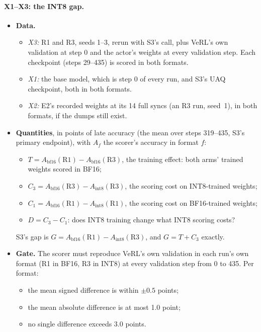 \documentclass[11pt]{article}
\begin{document}
\paragraph{X1--X3: the INT8 gap.}
\begin{itemize}
\item \textbf{Data.}
  \begin{itemize}
  \item \emph{X3:} R1 and R3, seeds 1--3, rerun with S3's call, plus VeRL's own validation at step 0 and the actor's weights at every validation step. Each checkpoint (steps 29--435) is scored in both formats.
  \item \emph{X1:} the base model, which is step 0 of every run, and S3's UAQ checkpoint, both in both formats.
  \item \emph{X2:} E2's recorded weights at its 14 full syncs (an R3 run, seed~1), in both formats, if the dumps still exist.
  \end{itemize}
\item \textbf{Quantities}, in points of late accuracy (the mean over steps 319--435, S3's primary endpoint), with $A_f$ the scorer's accuracy in format $f$:
  \begin{itemize}
  \item $T=A_{\mathrm{bf16}}(\mathrm{R1})-A_{\mathrm{bf16}}(\mathrm{R3})$, the training effect: both arms' trained weights scored in BF16;
  \item $C_3=A_{\mathrm{bf16}}(\mathrm{R3})-A_{\mathrm{int8}}(\mathrm{R3})$, the scoring cost on INT8-trained weights;
  \item $C_1=A_{\mathrm{bf16}}(\mathrm{R1})-A_{\mathrm{int8}}(\mathrm{R1})$, the scoring cost on BF16-trained weights;
  \item $D=C_3-C_1$: does INT8 training change what INT8 scoring costs?
  \end{itemize}
  S3's gap is $G=A_{\mathrm{bf16}}(\mathrm{R1})-A_{\mathrm{int8}}(\mathrm{R3})$, and $G=T+C_3$ exactly.
\item \textbf{Gate.} The scorer must reproduce VeRL's own validation in each run's own format (R1 in BF16, R3 in INT8) at every validation step from 0 to 435. Per format:
  \begin{itemize}
  \item the mean signed difference is within $\pm0.5$ points;
  \item the mean absolute difference is at most 1.0 point;
  \item no single difference exceeds 3.0 points.
  \end{itemize}

\end{itemize}
\end{document}
